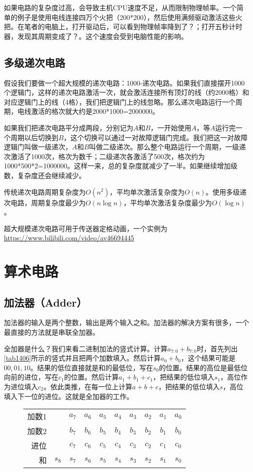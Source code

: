如果电路的复杂度过高，会导致主机CPU速度不足，从而限制物理帧率。一个简单的例子是使用电线连接四万个火把（200*200），然后使用满频驱动激活这些火把。在笔者的电脑上，打开驱动后，可以看到物理帧率降到了？；打开五秒计时器，发现其周期变成了？。这个速度会受到电脑性能的影响。

\subsection{多级递次电路}
假设我们要做一个超大规模的递次电路：1000-递次电路。如果我们直接摆开1000个逻辑门，这样的递次电路激活一次，就会激活连接所有顶灯的线（约2000格）和对应逻辑门上的线（4格），我们把逻辑门上的线忽略。那么递次电路运行一个周期，电线激活的格次就大约是2000*1000=2000000。

如果我们把递次电路平分成两段，分别记为$A$和$B$，一开始使用$A$，等$A$运行完一个周期以后切换到$B$，这个切换可以通过一对故障逻辑门完成。我们把这一对故障逻辑门叫做一级递次，$A$和$B$叫做二级递次。那么整个电路运行一个周期，一级递次激活了1000次，格次为数千；二级递次各激活了500次，格次约为1000*500*2=1000000。这样一来，总的复杂度就减少了一半。如果继续增加级数，复杂度还会继续减少。

传统递次电路周期复杂度为$O(n^2)$，平均单次激活复杂度为$O(n)$。使用多级递次电路，周期复杂度最少为$O(n\log n)$，平均单次激活复杂度最少为$O(\log n)$。

超大规模递次电路可用于传送器定格动画，一个实例为\url{https://www.bilibili.com/video/av46694445}

\section{算术电路}

\subsection{加法器（Adder）}
加法器的输入是两个整数，输出是两个输入之和。加法器的解决方案有很多，一个最直接的方法就是串联全加器。

全加器是什么？我们来看二进制加法的竖式计算。计算$a_{7:0}+b_{7:0}$时，首先列出\autoref{tab1406}所示的竖式并且把两个加数填入。然后计算$a_0+b_0$，这个结果可能是$00,01,10$。结果的低位直接就是和的最低位，写在$s_0$的位置。结果的高位是最低位向前的进位，写在$c_1$的位置。然后计算$a_1+b_1+c_1$，把结果的低位填入$s_1$，高位作为进位填入$c_2$。依此类推，在每一位上计算$a+b+c$，把结果的低位填入$s$，高位填入下一位的进位。这就是全加器的工作。

\begin{figure}[!h]
\centering
\begin{tabular}{rccccccccc}
加数1&&$a_7$&$a_6$&$a_5$&$a_4$&$a_3$&$a_2$&$a_1$&$a_0$\\
加数2&&$b_7$&$b_6$&$b_5$&$b_4$&$b_3$&$b_2$&$b_1$&$b_0$\\
进位&&$c_7$&$c_6$&$c_5$&$c_4$&$c_3$&$c_2$&$c_1$&$c_0$\\\hline
和&$s_8$&$s_7$&$s_6$&$s_5$&$s_4$&$s_3$&$s_2$&$s_1$&$s_0$
\end{tabular}
\caption{}\label{tab1406}
\end{figure}

